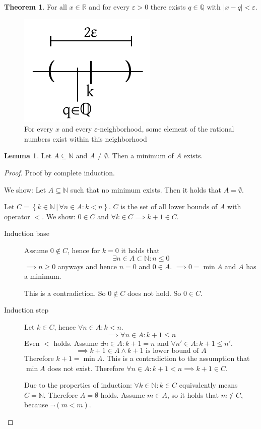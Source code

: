 \documentclass[a4paper,landscape,twocolumn]{article}
\theoremstyle{definition}
\newtheorem{theorem}{Theorem}
\newtheorem{lemma}{Lemma}
\newcommand\setdef[2]{\left\{#1\,|\,#2\right\}}
\newcommand\abs[1]{\left|#1\right|}
\begin{document}
\begin{theorem}
  \label{QisdenseinR}
  For all $x \in \mathbb R$ and for every $\varepsilon > 0$ there exists $q \in \mathbb Q$
  with $\abs{x - q} < \varepsilon$.

  \begin{figure}[!h]
    \begin{center}
      \includegraphics{img/dense_q.pdf}
      \caption{For every $x$ and every $\varepsilon$-neighborhood, some element of the rational numbers exist within this neighborhood}
    \end{center}
  \end{figure}
\end{theorem}
\begin{lemma}
  Let $A \subseteq \mathbb N$ and $A \neq \emptyset$.
  Then a minimum of $A$ exists.
\end{lemma}
\begin{proof}
  Proof by complete induction.

  We show: Let $A \subseteq \mathbb N$ such that no minimum exists.
  Then it holds that $A = \emptyset$.

  Let $C = \setdef{k \in \mathbb N}{\forall n \in A: k < n}$.
  $C$ is the set of all lower bounds of $A$ with operator $<$.
  We show: $0 \in C$ and $\forall k \in C \implies k + 1 \in C$.

  \begin{description}
    \item[Induction base]
      Assume $0 \not\in C$, hence for $k = 0$ it holds that
      \[ \exists n \in A \subset \mathbb N: n \leq 0 \]
      $\implies n \geq 0$ anyways and hence $n = 0$ and $0 \in A$.
      $\implies 0 = \min{A}$ and $A$ has a minimum.

      This is a contradiction. So $0 \not \in C$ does not hold.
      So $0 \in C$.
    \item[Induction step]
      Let $k \in C$, hence $\forall n \in A: k < n$.
      \[ \implies \forall n \in A: k + 1 \leq n \]
      Even $<$ holds. Assume $\exists n \in A: k + 1 = n$ and
      $\forall n' \in A: k + 1 \leq n'$.
      \[ \implies k + 1 \in A \land k + 1 \text{ is lower bound of } A \]
      Therefore $k + 1 = \min{A}$.
      This is a contradiction to the assumption that $\min{A}$ does not exist.
      Therefore $\forall n \in A: k + 1 < n \implies k + 1 \in C$.

      Due to the properties of induction: $\forall k \in \mathbb N: k \in C$
      equivalently means $C = \mathbb N$.
      Therefore $A = \emptyset$ holds.
      Assume $m \in A$, so it holds that $m \not\in C$, because $\neg (m < m)$.
  \end{description}
\end{proof}
\end{document}
